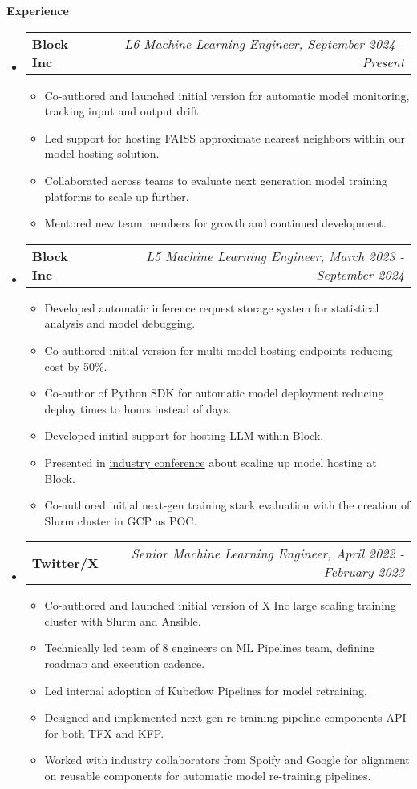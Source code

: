\documentclass[letterpaper,10pt]{article}
\makeatletter
\newcommand{\resitem}[1]{\item #1 \vspace{-2pt}}
\newcommand{\resheading}[1]{{\large \colorbox{mygrey}{\begin{minipage}{\textwidth}{\textbf{#1 \vphantom{p\^{E}}}}\end{minipage}}}}
\newcommand{\ressubheading}[4]{
\begin{tabular*}{7.0in}{l@{\extracolsep{\fill}}r}
		\textbf{#1} & \textit{#4} \\
\end{tabular*}\vspace{-6pt}}
\makeatother
\begin{document}
\resheading{Experience}
	\begin{itemize}
		\item
		\ressubheading{Block Inc}{Houston, TX}{L6 Machine Learning Engineer}{L6 Machine Learning Engineer, September 2024 - Present}
		\begin{itemize}
			\resitem{Co-authored and launched initial version for automatic model monitoring, tracking input and output drift.}
			\resitem{Led support for hosting FAISS approximate nearest neighbors within our model hosting solution.}
			\resitem{Collaborated across teams to evaluate next generation model training platforms to scale up further.}
			\resitem{Mentored new team members for growth and continued development.}
		\end{itemize}
		\item
			\ressubheading{Block Inc}{Boulder, CO}{L5 Machine Learning Engineer}{L5 Machine Learning Engineer, March 2023 - September 2024}
			\begin{itemize}
				\resitem{Developed automatic inference request storage system for statistical analysis and model debugging.}
				\resitem{Co-authored initial version for multi-model hosting endpoints reducing cost by 50\%.}
				\resitem{Co-author of Python SDK for automatic model deployment reducing deploy times to hours instead of days.}
				\resitem{Developed initial support for hosting LLM within Block.}
				\resitem{Presented in \href{https://www.youtube.com/watch?v=5WPrZgUu8u0}{industry conference} about scaling up model hosting at Block.}
				\resitem{Co-authored initial next-gen training stack evaluation with the creation of Slurm cluster in GCP as POC.}
			\end{itemize}
		\item
			\ressubheading{Twitter/X}{Boulder, CO}{Senior Machine Learning Engineer}{Senior Machine Learning Engineer, April 2022 - February 2023}
			\begin{itemize}
				\resitem{Co-authored and launched initial version of X Inc large scaling training cluster with Slurm and Ansible.}
				\resitem{Technically led team of 8 engineers on ML Pipelines team, defining roadmap and execution cadence.} 
				\resitem{Led internal adoption of Kubeflow Pipelines for model retraining.}
				\resitem{Designed and implemented next-gen re-training pipeline components API for both TFX and KFP.}
				\resitem{Worked with industry collaborators from Spoify and Google for alignment on reusable components for automatic model re-training pipelines.}
			\end{itemize}

\end{itemize}
\end{document}
